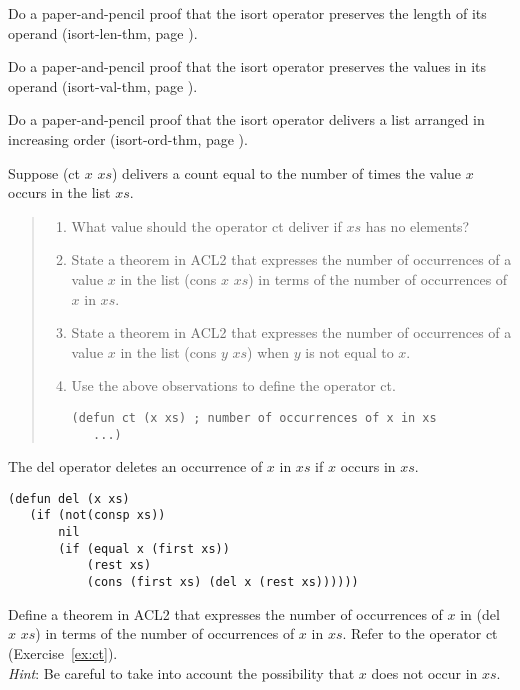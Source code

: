 \begin{ExerciseList}
\Exercise
Do a paper-and-pencil proof that the \textsf{isort} operator
preserves the length of its operand
(\textsf{isort-len-thm}, page \pageref{defthm:isort-len}).

\Exercise
Do a paper-and-pencil proof that the \textsf{isort} operator
preserves the values in its operand
(\textsf{isort-val-thm}, page \pageref{defthm:isort-val}).

\Exercise
Do a paper-and-pencil proof that the \textsf{isort} operator
delivers a list arranged in increasing order
(\textsf{isort-ord-thm}, page \pageref{defthm:isort-ord-thm}).

\Exercise\label{ex:ct}
Suppose \textsf{(ct $x$ $xs$)} delivers a count
equal to the number of times
the value $x$ occurs in the list $xs$.
\begin{quote}
\begin{enumerate}[label=\alph*{. }]
\item What value should the operator \textsf{ct} deliver if $xs$ has no elements?
\item State a theorem in ACL2 that expresses the
      number of occurrences of a value $x$ in the list \textsf{(cons $x$ $xs$)}
      in terms of the number of occurrences of $x$ in $xs$.
\item State a theorem in ACL2 that expresses the
      number of occurrences of a value $x$ in the list \textsf{(cons $y$ $xs$)}
      when $y$ is not equal to $x$.
\item Use the above observations to define the operator \textsf{ct}.
\begin{verbatim}
(defun ct (x xs) ; number of occurrences of x in xs
   ...)
\end{verbatim}
\end{enumerate}
\end{quote}

\Exercise
The 
\textsf{del} operator
deletes an occurrence of $x$ in $xs$
if $x$ occurs in $xs$.
\label{defun:del}
\begin{Verbatim}
(defun del (x xs)
   (if (not(consp xs))
       nil
       (if (equal x (first xs))
           (rest xs)
           (cons (first xs) (del x (rest xs))))))
\end{Verbatim}
Define a theorem in ACL2 that
expresses the number of occurrences of $x$ in \textsf{(del $x$ $xs$)}
in terms of the number of occurrences of $x$ in $xs$.
Refer to the operator \textsf{ct} (Exercise~\ref{ex:ct}).\\
\emph{Hint}: Be careful to take into account the possibility that
$x$ does not occur in $xs$.


\end{ExerciseList}
